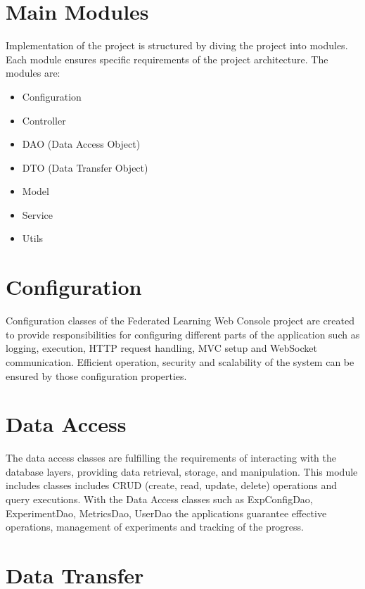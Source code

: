\section{Main Modules}

Implementation of the project is structured by diving the project into modules. Each module ensures specific requirements of the project architecture. The modules are:\\
\begin{itemize}
    \item Configuration
    \item Controller
    \item DAO (Data Access Object)
    \item DTO (Data Transfer Object)
    \item Model
    \item Service
    \item Utils
\end{itemize}

\section{Configuration}

Configuration classes of the Federated Learning Web Console project are created to provide responsibilities for configuring different parts of the application such as
logging, execution, HTTP request handling, MVC setup and WebSocket communication. Efficient operation, security and scalability of the system can be ensured by those configuration properties.

\section{Data Access}

The data access classes are fulfilling the requirements of interacting with the database layers, providing data retrieval, storage, and manipulation. This module includes classes includes CRUD
(create, read, update, delete) operations and query executions. With the Data Access classes such as ExpConfigDao, ExperimentDao, MetricsDao, UserDao the applications guarantee effective operations,
management of experiments and tracking of the progress.


\section{Data Transfer}

